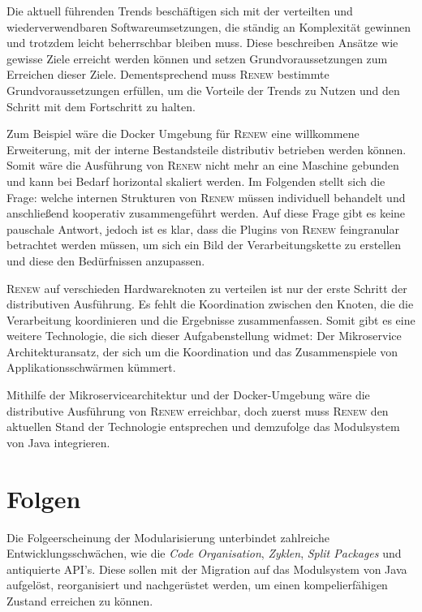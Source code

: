 		Die aktuell führenden Trends beschäftigen sich mit der verteilten und wiederverwendbaren Softwareumsetzungen, die ständig an Komplexität gewinnen und trotzdem leicht beherrschbar bleiben muss. Diese beschreiben Ansätze wie gewisse Ziele erreicht werden können und setzen Grundvoraussetzungen zum Erreichen dieser Ziele. Dementsprechend muss \textsc{Renew} bestimmte Grundvoraussetzungen erfüllen, um die Vorteile der Trends zu Nutzen und den Schritt mit dem Fortschritt zu halten.  \bigbreak

		Zum Beispiel wäre die Docker Umgebung für \textsc{Renew} eine willkommene Erweiterung, mit der interne Bestandsteile distributiv betrieben werden können. Somit wäre die Ausführung von \textsc{Renew} nicht mehr an eine Maschine gebunden und kann bei Bedarf horizontal skaliert werden. Im Folgenden stellt sich die Frage: welche internen Strukturen von \textsc{Renew} müssen individuell behandelt und anschließend kooperativ zusammengeführt werden. Auf diese Frage gibt es keine pauschale Antwort, jedoch ist es klar, dass die Plugins von \textsc{Renew} feingranular betrachtet werden müssen, um sich ein Bild der Verarbeitungskette zu erstellen und diese den Bedürfnissen anzupassen. \bigbreak

		\textsc{Renew} auf verschieden Hardwareknoten zu verteilen ist nur der erste Schritt der distributiven Ausführung. Es fehlt die Koordination zwischen den Knoten, die die Verarbeitung koordinieren und die Ergebnisse zusammenfassen. Somit gibt es eine weitere Technologie, die sich dieser Aufgabenstellung widmet: Der Mikroservice Architekturansatz, der sich um die Koordination und das Zusammenspiele von Applikationsschwärmen kümmert. \bigbreak

		Mithilfe der Mikroservicearchitektur und der Docker-Umgebung wäre die distributive Ausführung von \textsc{Renew} erreichbar, doch zuerst muss \textsc{Renew} den aktuellen Stand der Technologie entsprechen und demzufolge das Modulsystem von Java integrieren.  

\section{Folgen} \label{sec:auswirkung}
	Die Folgeerscheinung der Modularisierung unterbindet zahlreiche Entwicklungsschwächen, wie die \textit{Code Organisation}, \textit{Zyklen}, \textit{Split Packages} und antiquierte API's. Diese sollen mit der Migration auf das Modulsystem von Java aufgelöst, reorganisiert und nachgerüstet werden, um einen kompelierfähigen Zustand erreichen zu können.

